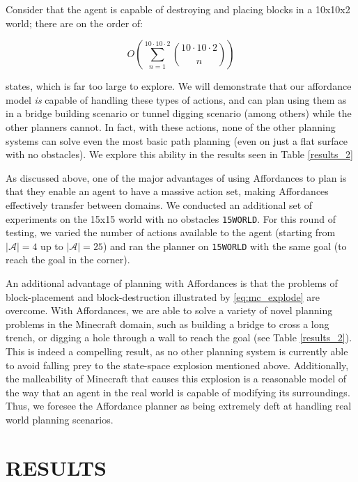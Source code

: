 \documentclass[]{article}
\begin{document}
Consider that the agent is capable of destroying and placing blocks 
in a 10x10x2 world; there are on the order of:

\begin{equation}
O\left(\sum_{n=1}^{10 \cdot 10 \cdot 2} \binom{10 \cdot 10 \cdot 2}{n}\right)
\label{eq:mc_explode}
\end{equation}

states, which is far too large to explore. We will demonstrate that our 
affordance model {\it is} capable of handling these types of actions, 
and can plan using them as in a bridge building scenario or tunnel 
digging scenario (among others) while the other planners cannot. 
In fact, with these actions, none of the other planning systems 
can solve even the most basic path planning (even on just a flat 
surface with no obstacles). We explore this ability in the results 
seen in Table \ref{results_2}

As discussed above, one of the major advantages of using Affordances 
to plan is that they enable an agent to have a massive action set, 
making Affordances effectively transfer between domains. We 
conducted an additional set of experiments on the 15x15 world 
with no obstacles \texttt{15WORLD}. For this round of testing, we 
varied the number of actions available to the agent (starting from 
$|\mathcal{A}| = 4$ up to $|\mathcal{A}| = 25$) and ran the planner 
on \texttt{15WORLD} with the same goal (to reach the goal in the corner).


An additional advantage of planning with Affordances is that the 
problems of block-placement and block-destruction illustrated by 
\ref{eq:mc_explode} are overcome. With Affordances, we are able 
to solve a variety of novel planning problems in the Minecraft 
domain, such as building a bridge to cross a long trench, or digging 
a hole through a wall to reach the goal (see Table \ref{results_2}). 
This is indeed a compelling result, as no other planning system is 
currently able to avoid falling prey to the state-space explosion 
mentioned above. Additionally, the malleability of Minecraft that 
causes this explosion is a reasonable model of the way that an 
agent in the real world is capable of modifying its surroundings. 
Thus, we foresee the Affordance planner as being extremely deft 
at handling real world planning scenarios.

\section{RESULTS}
\end{document}
